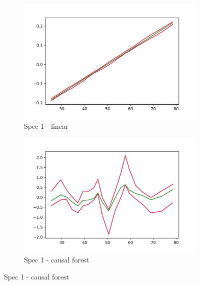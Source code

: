 \begin{figure}[t]
    \centering
    \begin{subfigure}{0.5\textwidth}
        \includegraphics[width=\textwidth]{figures/ALE/chNDexp/spec1_linear_AGE.png}
        \caption{Spec 1 - linear}
    \end{subfigure}%
    \begin{subfigure}{0.5\textwidth}
        \includegraphics[width=\textwidth]{figures/ALE/chNDexp/spec1_cf_AGE.png}
        \caption{Spec 1 - causal forest}
    \end{subfigure}

    

\end{figure}
